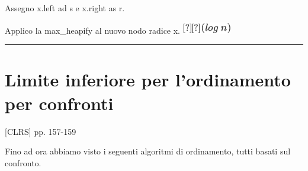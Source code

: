 \documentclass{article}
\begin{document}
{{Assegno x.left ad s e x.right as r.}

{Applico la max\_heapify al nuovo nodo radice x.
}\includegraphics{images/image150.png}

\begin{center}\rule{0.5\linewidth}{\linethickness}\end{center}

{}

\hypertarget{h.7gslm72cwwxs}{\section{\texorpdfstring{{Limite inferiore
per l'ordinamento per
confronti}}{Limite inferiore per l'ordinamento per confronti}}\label{h.7gslm72cwwxs}}

{{[}CLRS{]} pp. 157-159}

{}

{Fino ad ora abbiamo visto i seguenti algoritmi di ordinamento, tutti basati sul confronto.}

{}

\protect\hypertarget{t.d27200ce3c3d6e65597fb549126b470657d85de0}{}{}\protect\hypertarget{t.26}{}{}

}
\end{document}
